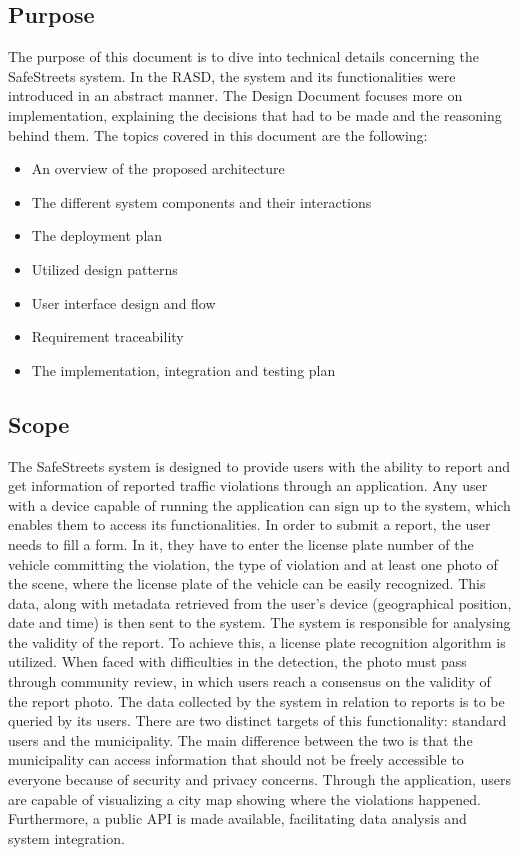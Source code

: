 \subsection{Purpose}

The purpose of this document is to dive into technical details concerning the SafeStreets system. In the RASD, the system and its functionalities were introduced in an abstract manner. The Design Document focuses more on implementation, explaining the decisions that had to be made and the reasoning behind them.
The topics covered in this document are the following:

\begin{itemize}
    \item 
    An overview of the proposed architecture
    \item 
    The different system components and their interactions
    \item 
    The deployment plan
    \item 
    Utilized design patterns
    \item 
    User interface design and flow
    \item 
    Requirement traceability
    \item 
    The implementation, integration and testing plan
\end{itemize}


\subsection{Scope}

The SafeStreets system is designed to provide users with the ability to report and get information of reported traffic violations through an application. 
Any user with a device capable of running the application can sign up to the system, which enables them to access its functionalities.
In order to submit a report, the user needs to fill a form. In it, they have to enter the license plate number of the vehicle committing the violation, the type of violation and at least one photo of the scene, where the license plate of the vehicle can be easily recognized. This data, along with metadata retrieved from the user's device (geographical position, date and time) is then sent to the system.
The system is responsible for analysing the validity of the report. To achieve this, a license plate recognition algorithm is utilized. When faced with difficulties in the detection, the photo must pass through community review, in which users reach a consensus on the validity of the report photo.
The data collected by the system in relation to reports is to be queried by its users. There are two distinct targets of this functionality: standard users and the municipality. The main difference between the two is that the municipality can access information that should not be freely accessible to everyone because of security and privacy concerns. Through the application, users are capable of visualizing a city map showing where the violations happened. Furthermore, a public API is made available, facilitating data analysis and system integration.

